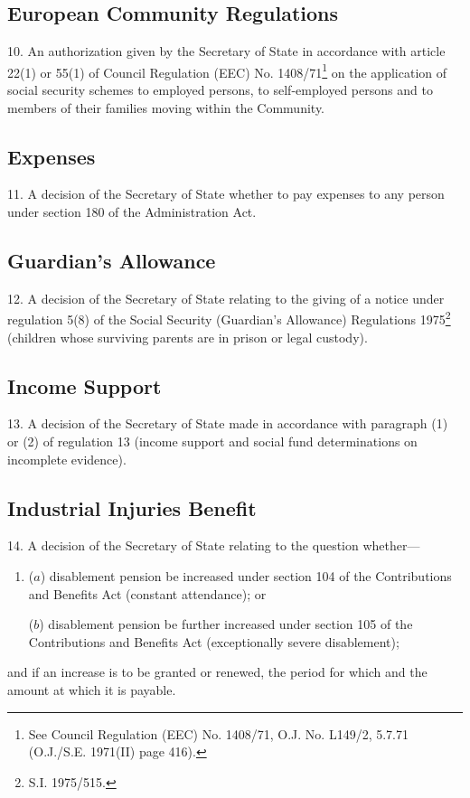 \documentclass[12pt,a4paper]{article}
\begin{document}
\subsection*{European Community Regulations}

10.  An authorization given by the Secretary of State in accordance with article 22(1) or 55(1) of Council Regulation (EEC) No. 1408/71\footnote{\frenchspacing See Council Regulation (EEC) No. 1408/71, O.J. No. L149/2, 5.7.71 (O.J./S.E. 1971(II) page 416).} on the application of social security schemes to employed persons, to self-employed persons and to members of their families moving within the Community.

\subsection*{Expenses}

11.  A decision of the Secretary of State whether to pay expenses to any person under section 180 of the Administration Act.

\subsection*{Guardian’s Allowance}

12.  A decision of the Secretary of State relating to the giving of a notice under regulation 5(8) of the Social Security (Guardian’s Allowance) Regulations 1975\footnote{\frenchspacing S.I. 1975/515.} (children whose surviving parents are in prison or legal custody).

\subsection*{Income Support}

13.  A decision of the Secretary of State 
made in accordance with paragraph (1) or (2) of regulation 13 (income support and social fund determinations on incomplete evidence).


\subsection*{Industrial Injuries Benefit}

14.  A decision of the Secretary of State relating to the question whether—
\begin{enumerate}\item[]
($a$) disablement pension be increased under section 104 of the Contributions and Benefits Act (constant attendance); or

($b$) disablement pension be further increased under section 105 of the Contributions and Benefits Act (exceptionally severe disablement);
\end{enumerate}
and if an increase is to be granted or renewed, the period for which and the amount at which it is payable.
\end{document}
